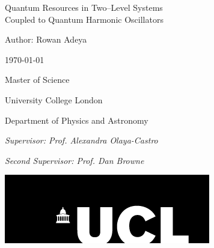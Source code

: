 \documentclass[11pt]{article}
\begin{document}
\begin{titlepage}
    \centering
    {\Huge {Quantum Resources in Two--Level Systems\\
    Coupled to Quantum Harmonic Oscillators}\par}

        
    \vspace{4cm}
    {\large Author: Rowan Adeya \par}
    {\large \today \par}
    
    \vspace{4cm}
    {\Large Master of Science \par}
    \vspace{0.3cm}
    {\Large University College London \par}
    \vspace{0.3cm}
    {\Large Department of Physics and Astronomy \par}
    \vspace{2.5cm}
    {\large \textit{Supervisor: Prof. Alexandra Olaya-Castro} \par}
    {\large \textit{Second Supervisor: Prof. Dan Browne} \par}
    \vspace{4cm}
    \includegraphics[scale=0.7]{Images/ucl_logo.png}\par
    


    
\end{titlepage}


\newpage
\end{document}
